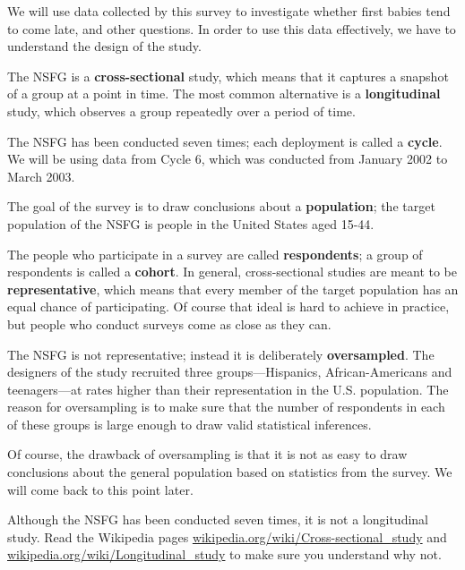 \documentclass[12pt]{book}
\begin{document}

We will use data collected by this survey to investigate whether first
babies tend to come late, and other questions.  In order to use this
data effectively, we have to understand the design of the study.

The NSFG is a {\bf cross-sectional} study, which means that it
captures a snapshot of a group at a point in time.  The most
common alternative is a {\bf longitudinal} study, which observes a
group repeatedly over a period of time.


The NSFG has been conducted seven times; each deployment is called
a {\bf cycle}.  We will be using data from Cycle 6, which was
conducted from January 2002 to March 2003.


The goal of the survey is to draw conclusions about a
{\bf population}; the target population of the NSFG is people in
the United States aged 15-44.


The people who participate in a survey are called {\bf respondents};
a group of respondents is called a {\bf cohort}.
In general, cross-sectional studies are meant to be {\bf
  representative}, which means that every member of the target
population has an equal chance of participating.  Of course that ideal
is hard to achieve in practice, but people who conduct surveys come as
close as they can.


The NSFG is not representative; instead it is deliberately {\bf
  oversampled}.  The designers of the study recruited three
groups---Hispanics, African-Americans and teenagers---at rates higher
than their representation in the U.S. population.
The reason for oversampling is to make sure that the number of
respondents in each of these groups is large enough to draw valid
statistical inferences.


Of course, the drawback of oversampling is that it is not as easy
to draw conclusions about the general population based on statistics
from the survey.  We will come back to this point later.

\begin{exercise}
Although the NSFG has been conducted seven times, it is not a
longitudinal study.  Read the Wikipedia pages
\url{wikipedia.org/wiki/Cross-sectional_study}
and
\url{wikipedia.org/wiki/Longitudinal_study}
to make sure you understand why not.

\end{exercise}
\end{document}
